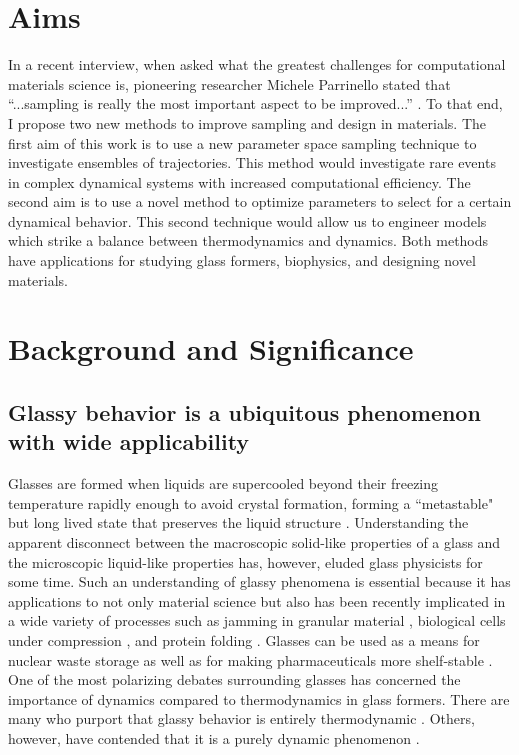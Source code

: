 \documentclass[11pt]{article}
\begin{document}
\section*{Aims}
In a recent interview, when asked what the greatest challenges for computational materials science is, pioneering researcher Michele Parrinello stated that ``...sampling is really the most important aspect to be improved...'' \cite{Parrinello2010}.
To that end, I propose two new methods to improve sampling and design in materials.  The first aim of this work is to use a new parameter space sampling technique to investigate ensembles of trajectories.  This method would investigate rare events in complex dynamical systems with increased computational efficiency. The second aim is to use a novel method to optimize parameters to select for a certain dynamical behavior.  This second technique would allow us to engineer models which strike a balance between thermodynamics and dynamics.  Both methods have applications for studying glass formers, biophysics, and designing novel materials.

\section*{Background and Significance}

\subsection*{Glassy behavior is a ubiquitous phenomenon with wide applicability}
Glasses are formed when liquids are supercooled beyond their freezing temperature rapidly enough to avoid crystal formation, forming a ``metastable" but long lived state that preserves the liquid structure \cite{Ediger1996, Angell_Science_1995}.   Understanding the apparent disconnect between the macroscopic solid-like properties of a glass and the microscopic liquid-like properties has, however, eluded glass physicists for some time. Such an understanding of glassy phenomena is essential because it has applications to not only material science \cite{Schulli2010} but also has been recently implicated in a wide variety of processes such as jamming in granular material \cite{Clusel2009}, biological cells under compression \cite{Zhou2009}, and protein folding \cite{Gin2009}. Glasses can be used as a means for nuclear waste storage \cite{Sales1984} as well as for making pharmaceuticals more shelf-stable \cite{Craig1999}. One of the most polarizing debates surrounding glasses has concerned the importance of dynamics compared to thermodynamics in glass formers.  There are many who purport that glassy behavior is entirely thermodynamic \cite{Lubchenko_AnnuRevPhysChem_May_2007}. Others, however, have contended that it is a purely dynamic phenomenon \cite{Garrahan2003}.
\end{document}
